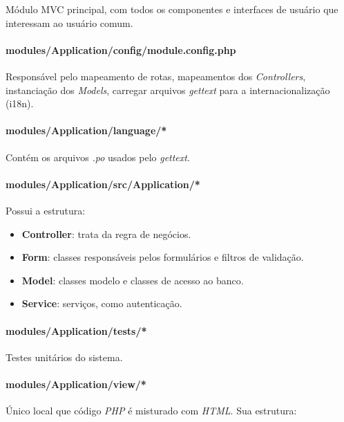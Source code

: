 Módulo MVC principal, com todos os componentes e interfaces de usuário
que interessam ao usuário comum.

\paragraph{modules/Application/config/module.config.php}

Responsável pelo mapeamento de rotas, mapeamentos dos
\emph{Controllers}, instanciação dos \emph{Models}, carregar arquivos
\emph{gettext} para a internacionalização (i18n).

\paragraph{modules/Application/language/*}

Contém os arquivos \emph{.po} usados pelo \emph{gettext}.

\paragraph{modules/Application/src/Application/*}

Possui a estrutura:

\begin{itemize}
\item
  \textbf{Controller}: trata da regra de negócios.
\item
  \textbf{Form}: classes responsáveis pelos formulários e filtros de
  validação.
\item
  \textbf{Model}: classes modelo e classes de acesso ao banco.
\item
  \textbf{Service}: serviços, como autenticação.
\end{itemize}
\paragraph{modules/Application/tests/*}

Testes unitários do sistema.

\paragraph{modules/Application/view/*}

Único local que código \emph{PHP} é misturado com \emph{HTML}. Sua
estrutura:

